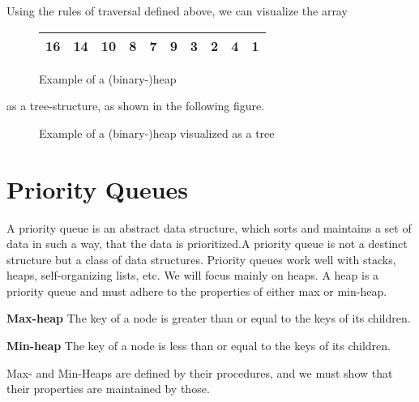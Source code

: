 \newpage
\noindent Using the rules of traversal defined above, we can visualize the
array
\begin{figure}[H]
	\center
	\begin{tabular}{|c|c|c|c|c|c|c|c|c|c|}
		\hline 16 & 14 & 10 & 8 & 7 & 9 & 3 & 2 & 4 & 1 \\ \hline
	\end{tabular}
	\caption{Example of a (binary-)heap}
	\label{fig:heap-array}
\end{figure}
as a tree-structure, as shown in the following figure.
\begin{figure}[H]
	\center
	\caption{Example of a (binary-)heap visualized as a tree}
	\label{fig:heap-tree}
\end{figure}

\section{Priority Queues}
\label{ch:heaps|sub:priorityqueues}
A priority queue is an abstract data structure, which sorts and maintains a
set of data in such a way, that the data is prioritized.A priority queue is not a destinct structure but a
class of data structures. Priority queues work well with stacks, heaps, self-organizing lists, etc. We will focus
mainly on heaps.
A heap is a priority queue and must adhere to the properties of either max or min-heap.
\begin{description}
	\item \textbf{Max-heap} The key of a node is greater than or equal to the
keys of its children.
	\item \textbf{Min-heap} The key of a node is less than or equal to the
keys of its children.
\end{description}
Max- and Min-Heaps are defined by their procedures, and we must show that their properties are maintained by those.

